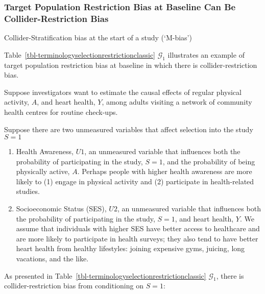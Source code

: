 \documentclass[
  single column]{article}
\begin{document}
\subsubsection{Target Population Restriction Bias at Baseline Can Be
Collider-Restriction
Bias}\label{target-population-restriction-bias-at-baseline-can-be-collider-restriction-bias}

\begin{table}

\caption{\label{tbl-terminologyselectionrestrictionclassic}Collider-Stratification
bias at the start of a study (`M-bias')}

\centering{

\terminologyselectionrestrictionclassic

}

\end{table}%

Table~\ref{tbl-terminologyselectionrestrictionclassic} \(\mathcal{G}_1\)
illustrates an example of target population restriction bias at baseline
in which there is collider-restriction bias.

Suppose investigators want to estimate the causal effects of regular
physical activity, \(A\), and heart health, \(Y\), among adults visiting
a network of community health centres for routine check-ups.

Suppose there are two unmeasured variables that affect selection into
the study \(S=1\)

\begin{enumerate}
\def\labelenumi{\arabic{enumi}.}
\item
  Health Awareness, \(U1\), an unmeasured variable that influences both
  the probability of participating in the study, \(\boxed{S = 1}\), and
  the probability of being physically active, \(A\). Perhaps people with
  higher health awareness are more likely to (1) engage in physical
  activity and (2) participate in health-related studies.
\item
  Socioeconomic Status (SES), \(U2\), an unmeasured variable that
  influences both the probability of participating in the study,
  \(\boxed{S = 1}\), and heart health, \(Y\). We assume that individuals
  with higher SES have better access to healthcare and are more likely
  to participate in health surveys; they also tend to have better heart
  health from healthy lifestyles: joining expensive gyms, juicing, long
  vacations, and the like.
\end{enumerate}

As presented in Table~\ref{tbl-terminologyselectionrestrictionclassic}
\(\mathcal{G}_1\), there is collider-restriction bias from conditioning
on \(S=1\):
\end{document}
